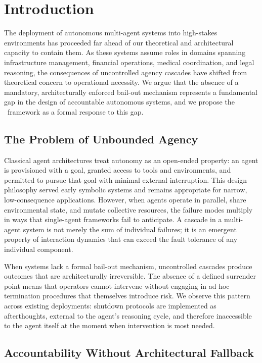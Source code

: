 \section{Introduction}

The deployment of autonomous multi-agent systems into high-stakes environments has proceeded far ahead of our theoretical and architectural capacity to contain them. As these systems assume roles in domains spanning infrastructure management, financial operations, medical coordination, and legal reasoning, the consequences of uncontrolled agency cascades have shifted from theoretical concern to operational necessity. We argue that the absence of a mandatory, architecturally enforced bail-out mechanism represents a fundamental gap in the design of accountable autonomous systems, and we propose the \bxthree\ framework as a formal response to this gap.

\subsection{The Problem of Unbounded Agency}

Classical agent architectures treat autonomy as an open-ended property: an agent is provisioned with a goal, granted access to tools and environments, and permitted to pursue that goal with minimal external interruption. This design philosophy served early symbolic systems and remains appropriate for narrow, low-consequence applications. However, when agents operate in parallel, share environmental state, and mutate collective resources, the failure modes multiply in ways that single-agent frameworks fail to anticipate. A cascade in a multi-agent system is not merely the sum of individual failures; it is an emergent property of interaction dynamics that can exceed the fault tolerance of any individual component.

When systems lack a formal bail-out mechanism, uncontrolled cascades produce outcomes that are architecturally irreversible. The absence of a defined surrender point means that operators cannot intervene without engaging in ad hoc termination procedures that themselves introduce risk. We observe this pattern across existing deployments: shutdown protocols are implemented as afterthoughts, external to the agent's reasoning cycle, and therefore inaccessible to the agent itself at the moment when intervention is most needed.

\subsection{Accountability Without Architectural Fallback}

